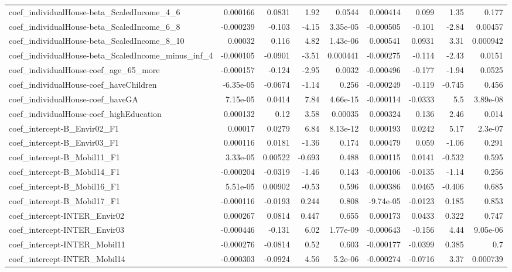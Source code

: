 \begin{tabular}{lrrrrrrrr}
coef_individualHouse-beta_ScaledIncome_4_6 & 0.000166 & 0.0831 & 1.92 & 0.0544 & 0.000414 & 0.099 & 1.35 & 0.177 \\
coef_individualHouse-beta_ScaledIncome_6_8 & -0.000239 & -0.103 & -4.15 & 3.35e-05 & -0.000505 & -0.101 & -2.84 & 0.00457 \\
coef_individualHouse-beta_ScaledIncome_8_10 & 0.00032 & 0.116 & 4.82 & 1.43e-06 & 0.000541 & 0.0931 & 3.31 & 0.000942 \\
coef_individualHouse-beta_ScaledIncome_minus_inf_4 & -0.000105 & -0.0901 & -3.51 & 0.000441 & -0.000275 & -0.114 & -2.43 & 0.0151 \\
coef_individualHouse-coef_age_65_more & -0.000157 & -0.124 & -2.95 & 0.0032 & -0.000496 & -0.177 & -1.94 & 0.0525 \\
coef_individualHouse-coef_haveChildren & -6.35e-05 & -0.0674 & -1.14 & 0.256 & -0.000249 & -0.119 & -0.745 & 0.456 \\
coef_individualHouse-coef_haveGA & 7.15e-05 & 0.0414 & 7.84 & 4.66e-15 & -0.000114 & -0.0333 & 5.5 & 3.89e-08 \\
coef_individualHouse-coef_highEducation & 0.000132 & 0.12 & 3.58 & 0.00035 & 0.000324 & 0.136 & 2.46 & 0.014 \\
coef_intercept-B_Envir02_F1 & 0.00017 & 0.0279 & 6.84 & 8.13e-12 & 0.000193 & 0.0242 & 5.17 & 2.3e-07 \\
coef_intercept-B_Envir03_F1 & 0.000116 & 0.0181 & -1.36 & 0.174 & 0.000479 & 0.059 & -1.06 & 0.291 \\
coef_intercept-B_Mobil11_F1 & 3.33e-05 & 0.00522 & -0.693 & 0.488 & 0.000115 & 0.0141 & -0.532 & 0.595 \\
coef_intercept-B_Mobil14_F1 & -0.000204 & -0.0319 & -1.46 & 0.143 & -0.000106 & -0.0135 & -1.14 & 0.256 \\
coef_intercept-B_Mobil16_F1 & 5.51e-05 & 0.00902 & -0.53 & 0.596 & 0.000386 & 0.0465 & -0.406 & 0.685 \\
coef_intercept-B_Mobil17_F1 & -0.000116 & -0.0193 & 0.244 & 0.808 & -9.74e-05 & -0.0123 & 0.185 & 0.853 \\
coef_intercept-INTER_Envir02 & 0.000267 & 0.0814 & 0.447 & 0.655 & 0.000173 & 0.0433 & 0.322 & 0.747 \\
coef_intercept-INTER_Envir03 & -0.000446 & -0.131 & 6.02 & 1.77e-09 & -0.000643 & -0.156 & 4.44 & 9.05e-06 \\
coef_intercept-INTER_Mobil11 & -0.000276 & -0.0814 & 0.52 & 0.603 & -0.000177 & -0.0399 & 0.385 & 0.7 \\
coef_intercept-INTER_Mobil14 & -0.000303 & -0.0924 & 4.56 & 5.2e-06 & -0.000274 & -0.0716 & 3.37 & 0.000739 \\

\end{tabular}
